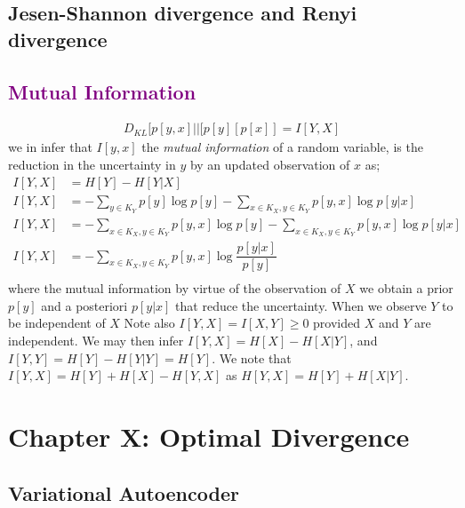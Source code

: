 \documentclass[7pt]{article}
\begin{document}
\subsection{Jesen-Shannon divergence and Renyi divergence}
\subsection*{\textcolor{purple}{Mutual Information}}

\begin{equation}
\begin{split}
D_{KL} [p[y,x]||[p[y][p[x]] = I[Y,X]
\end{split}
\end{equation}
we in infer that $I[y,x]$  the \emph{mutual information} of a random variable, is the reduction in the uncertainty in $y$ by an updated observation of $x$ as;
\begin{equation}
\begin{split}
I[Y,X] & = H[Y] - H[Y|X] \\
I[Y,X] & = - \sum_{y \in K_Y} p[y] \log p[y] - \sum_{x \in K_X,y \in K_Y } p[y,x] \log p[y|x] \\
I[Y,X] & = - \sum_{x \in K_X,y \in K_Y } p[y,x] \log p[y] - \sum_{x \in K_X,y \in K_Y } p[y,x] \log p[y|x] \\
I[Y,X] & = - \sum_{x \in K_X,y \in K_Y } p[y,x] \log \dfrac{ p[y|x]}{p[y]} \\
\end{split}
\end{equation}
where the mutual information  by virtue of the observation of $X$ we obtain a prior $p[y]$  and a posteriori $p[y|x]$ that reduce the uncertainty. When we observe $Y$ to be independent of $X$ Note also $I[Y,X] = I[X,Y] \geq 0$ provided $X$ and $Y$ are independent. We may then infer $I[Y,X] =  H[X] - H[X|Y]$, and $I[Y,Y] = H[Y] - H[Y|Y] = H[Y]$.  We note that $I[Y,X] =  H[Y] + H[X] - H[Y,X]$ as $H[Y,X] = H[Y] + H[X|Y]$.

\section{Chapter X: Optimal Divergence}

\subsection{Variational Autoencoder}
\end{document}
